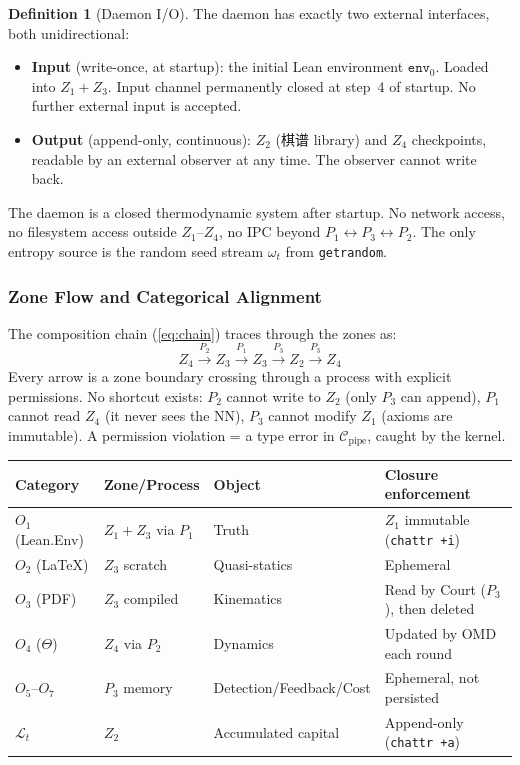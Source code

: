 \documentclass[11pt,a4paper]{article}
\theoremstyle{definition}
\newtheorem{definition}[theorem]{Definition}
\theoremstyle{remark}
\begin{document}
\begin{definition}[Daemon I/O]\label{def:daemon_io}
The daemon has exactly two external interfaces, both unidirectional:
\begin{itemize}[nosep]
\item \textbf{Input} (write-once, at startup): the initial Lean environment $\texttt{env}_0$. Loaded into $Z_1 + Z_3$. Input channel permanently closed at step~4 of startup. No further external input is accepted.
\item \textbf{Output} (append-only, continuous): $Z_2$ (棋谱 library) and $Z_4$ checkpoints, readable by an external observer at any time. The observer cannot write back.
\end{itemize}
The daemon is a closed thermodynamic system after startup. No network access, no filesystem access outside $Z_1$--$Z_4$, no IPC beyond $P_1 \leftrightarrow P_3 \leftrightarrow P_2$. The only entropy source is the random seed stream $\omega_t$ from \texttt{getrandom}.
\end{definition}


\subsubsection*{Zone Flow and Categorical Alignment}

The composition chain (\ref{eq:chain}) traces through the zones as:
\[
  Z_4 \xrightarrow{P_2} Z_3 \xrightarrow{P_1} Z_3 \xrightarrow{P_3} Z_2 \xrightarrow{P_3} Z_4
\]
Every arrow is a zone boundary crossing through a process with explicit permissions. No shortcut exists: $P_2$ cannot write to $Z_2$ (only $P_3$ can append), $P_1$ cannot read $Z_4$ (it never sees the NN), $P_3$ cannot modify $Z_1$ (axioms are immutable). A permission violation = a type error in $\mathcal{C}_{\mathrm{pipe}}$, caught by the kernel.

\begin{center}
\small
\begin{tabularx}{\textwidth}{l l l X}
\toprule
\textbf{Category} & \textbf{Zone/Process} & \textbf{Object} & \textbf{Closure enforcement} \\
\midrule
$O_1$ (Lean.Env) & $Z_1 + Z_3$ via $P_1$ & Truth & $Z_1$ immutable (\texttt{chattr +i}) \\
$O_2$ (LaTeX) & $Z_3$ scratch & Quasi-statics & Ephemeral \\
$O_3$ (PDF) & $Z_3$ compiled & Kinematics & Read by Court ($P_3$), then deleted \\
$O_4$ ($\Theta$) & $Z_4$ via $P_2$ & Dynamics & Updated by OMD each round \\
$O_5$--$O_7$ & $P_3$ memory & Detection/Feedback/Cost & Ephemeral, not persisted \\
$\mathcal{L}_t$ & $Z_2$ & Accumulated capital & Append-only (\texttt{chattr +a}) \\
\bottomrule
\end{tabularx}
\end{center}
\end{document}
